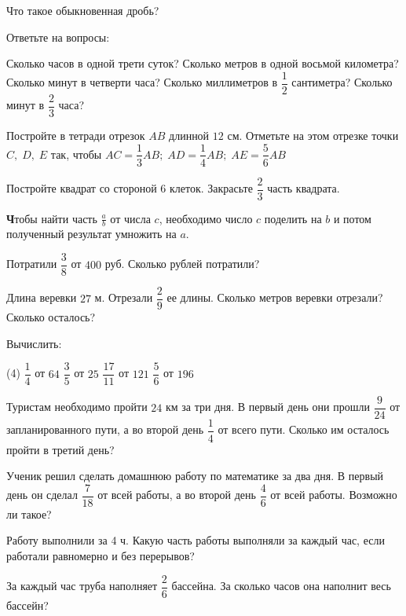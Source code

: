 \begin{class}[number=3]
	\begin{listofex}
	\item Что такое обыкновенная дробь?
	\item Ответьте на вопросы:
	\begin{tasks}
		\task Сколько часов в одной трети суток?
		\task Сколько метров в одной восьмой километра?
		\task Сколько минут в четверти часа?
		\task Сколько миллиметров в \( \dfrac{1}{2} \) сантиметра?
		\task Сколько минут в \( \dfrac{2}{3} \) часа?
	\end{tasks}
	\item Постройте в тетради отрезок \( AB \) длинной \( 12 \) см. Отметьте на этом отрезке точки \( C,\;D,\;E \) так, чтобы \( AC=\dfrac{1}{3}AB;\;AD=\dfrac{1}{4}AB;\;AE=\dfrac{5}{6}AB \)
	\item Постройте квадрат со стороной 6 клеток. Закрасьте \( \dfrac{2}{3} \) часть квадрата.
\end{listofex}
\begin{definit}
	\textbf Чтобы найти часть \( \frac{a}{b} \) от числа \( c \), необходимо число \( c \) поделить на \( b \) и потом полученный результат умножить на \( a \).
\end{definit}
\begin{listofex}[start=5]
	\item Потратили \( \dfrac{3}{8} \) от \( 400 \) руб. Сколько рублей потратили?
	\item Длина веревки \( 27 \) м. Отрезали \( \dfrac{2}{9} \) ее длины. Сколько метров веревки отрезали? Сколько осталось?
	\item Вычислить:
	\begin{tasks}(4)
		\task \( \dfrac{1}{4} \) от \( 64 \)
		\task \( \dfrac{3}{5} \) от \( 25 \)
		\task \( \dfrac{17}{11} \) от \( 121 \)
		\task \( \dfrac{5}{6} \) от \( 196 \)
	\end{tasks}
	\item Туристам необходимо пройти \( 24 \) км за три дня. В первый день они прошли \( \dfrac{9}{24} \) от запланированного пути, а во второй день \( \dfrac{1}{4} \) от всего пути. Сколько им осталось пройти в третий день?
	\item Ученик решил сделать домашнюю работу по математике за два дня. В первый день он сделал \( \dfrac{7}{18} \) от всей работы, а во второй день \( \dfrac{4}{6} \) от всей работы. Возможно ли такое?
	\item Работу выполнили за 4 ч. Какую часть работы выполняли за каждый час, если работали равномерно и без перерывов?
	\item За каждый час труба наполняет \( \dfrac{2}{6} \) бассейна. За сколько часов она наполнит весь бассейн?
	\end{listofex}
\end{class}

